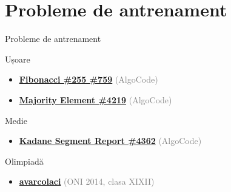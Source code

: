 ﻿\documentclass{beamer}
\begin{document}
\section{Probleme de antrenament}

\begin{frame}{Probleme de antrenament}
  \begin{block}{Ușoare}
    \begin{itemize}\footnotesize\itemsep0pt
      \item \href{https://code.algolymp.com/problems/759}{\textbf{Fibonacci \#255 \#759}} {\footnotesize\textcolor{gray}{(AlgoCode)}}
      \item \href{https://code.algolymp.com/problems/4219}{\textbf{Majority Element \#4219}} {\footnotesize\textcolor{gray}{(AlgoCode)}}
    \end{itemize}
  \end{block}
  \vspace{-4pt}
  \begin{block}{Medie}
    \begin{itemize}\footnotesize\itemsep0pt
      \item \href{https://code.algolymp.com/problems/4362}{\textbf{Kadane Segment Report \#4362}} {\footnotesize\textcolor{gray}{(AlgoCode)}}
    \end{itemize}
  \end{block}
  \vspace{-4pt}
  \begin{block}{Olimpiadă}
    \begin{itemize}\footnotesize\itemsep0pt
      \item \href{https://code.algolymp.com/problems/226}{\textbf{avarcolaci}} {\footnotesize\textcolor{gray}{(ONI 2014, clasa XI\textendash{}XII)}}
    \end{itemize}
  \end{block}
\end{frame}
\end{document}
